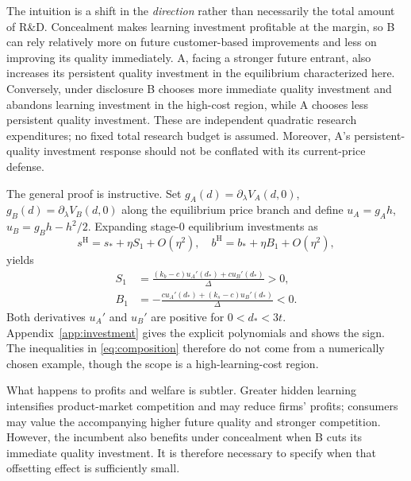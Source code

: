 \documentclass[11pt,a4paper]{article}
\numberwithin{equation}{section}
\theoremstyle{remark}
\newcommand{\HH}{\mathrm{H}}
\begin{document}
The intuition is a shift in the \emph{direction} rather than necessarily the total amount of R\&D. Concealment makes learning investment profitable at the margin, so B can rely relatively more on future customer-based improvements and less on improving its quality immediately. A, facing a stronger future entrant, also increases its persistent quality investment in the equilibrium characterized here. Conversely, under disclosure B chooses more immediate quality investment and abandons learning investment in the high-cost region, while A chooses less persistent quality investment. These are independent quadratic research expenditures; no fixed total research budget is assumed. Moreover, A's persistent-quality investment response should not be conflated with its current-price defense.

The general proof is instructive. Set $g_A(d)=\partial_\lambda V_A(d,0)$, $g_B(d)=\partial_\lambda V_B(d,0)$ along the equilibrium price branch and define $u_A=g_Ah$, $u_B=g_Bh-h^2/2$. Expanding stage-0 equilibrium investments as
\begin{equation}
s^{\HH}=s_*+\eta S_1+O(\eta^2),\quad
b^{\HH}=b_*+\eta B_1+O(\eta^2),
\end{equation}
yields
\begin{align}
S_1&=\frac{(k_b-c)u_A'(d_*)+c u_B'(d_*)}{\Delta}>0,\label{eq:scoef}\\
B_1&=-\frac{c u_A'(d_*)+(k_s-c)u_B'(d_*)}{\Delta}<0.\label{eq:bcoef}
\end{align}
Both derivatives $u_A'$ and $u_B'$ are positive for $0<d_*<3t$. Appendix~\ref{app:investment} gives the explicit polynomials and shows the sign. The inequalities in \eqref{eq:composition} therefore do not come from a numerically chosen example, though the scope is a high-learning-cost region.

What happens to profits and welfare is subtler. Greater hidden learning intensifies product-market competition and may reduce firms' profits; consumers may value the accompanying higher future quality and stronger competition. However, the incumbent also benefits under concealment when B cuts its immediate quality investment. It is therefore necessary to specify when that offsetting effect is sufficiently small.
\end{document}
